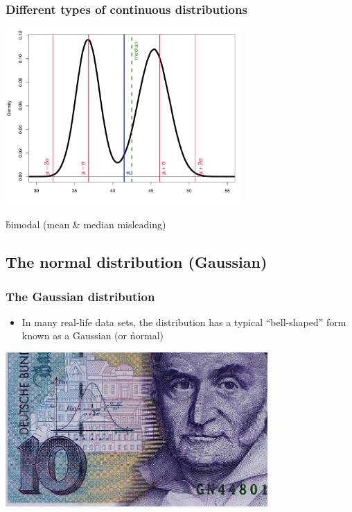 \documentclass[t]{beamer} %
\begin{document}
\begin{frame}
  \frametitle{Different types of continuous distributions}
  
  \ungap[1]
  \begin{center}
    \includegraphics[width=9cm]{img/disttype_bimodal}

    \ungap[1]
    \h{bimodal} (mean \& median misleading)
  \end{center}
\end{frame}

\subsection{The normal distribution (Gaussian)}

\begin{frame}
  \frametitle{The Gaussian distribution}

  \begin{itemize}
  \item In many real-life data sets, the distribution has a typical
    ``bell-shaped'' form known as a \h{Gaussian} (or \h{normal}) 
  \end{itemize}

  \pause
  \begin{center}
    \includegraphics[width=10cm]{img/gauss_10dm}
  \end{center}
\end{frame}
\end{document}
